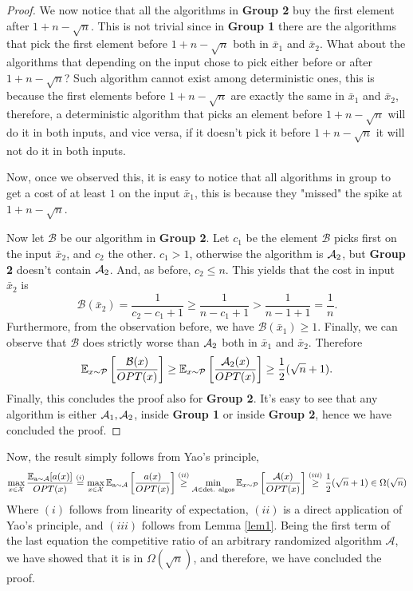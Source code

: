 \documentclass[11pt]{article}
\begin{document}
\begin{enumerate}
\begin{proof}
    We now notice that all the algorithms in \textbf{Group 2} buy the first element after $1 + n - \sqrt{n}$. This is not trivial since in \textbf{Group 1} there are the algorithms that pick the first element before $1 + n - \sqrt{n}$ both in $\bar x_1$ and $\bar x_2$. What about the algorithms that depending on the input chose to pick either before or after $1 + n - \sqrt{n}$? Such algorithm cannot exist among deterministic ones, this is because the first elements before $1 + n - \sqrt{n}$ are exactly the same in $\bar x_1$ and $\bar x_2$, therefore, a deterministic algorithm that picks an element before $1 + n - \sqrt{n}$ will do it in both inputs, and vice versa, if it doesn't pick it before $1 + n - \sqrt{n}$ it will not do it in both inputs.

    Now, once we observed this, it is easy to notice that all algorithms in group to get a cost of at least $1$ on the input $\bar x_1$, this is because they "missed" the spike at $1 + n - \sqrt{n}$. 
    
    Now let $\mathcal {B}$ be our algorithm in \textbf{Group 2}. Let $c_1$ be the element $\mathcal {B}$ picks first on the input $\bar x_2$, and $c_2$ the other. $c_1>1$, otherwise the algorithm is $\mathcal{A}_2$, but \textbf{Group 2} doesn't contain $\mathcal{A}_2$. And, as before, $c_2\leq n$. This yields that the cost in input $\bar x_2$ is 
    \begin{equation*}
        \mathcal {B}(\bar x_2) = \frac{1}{c_2 - c_1 + 1} \geq  \frac{1}{n - c_1 + 1} > \frac{1}{n-1+1} = \frac{1}{n}.
    \end{equation*}
    Furthermore, from the observation before, we have $\mathcal{B}(\bar x_1) \geq 1$. Finally, we can observe that $\mathcal{B}$ does strictly worse than $\mathcal{A}_2$ both in $\bar x_1$ and $\bar x_2$. Therefore
    \begin{equation*}
        \mathbb{E} _{x\sim \mathcal{P}}\left[\frac{\mathcal{B}(x)}{OPT(x)}\right] \geq \mathbb{E} _{x\sim \mathcal{P}}\left[\frac{\mathcal{A}_2(x)}{OPT(x)}\right] \geq \frac{1}{2}(\sqrt{n} + 1).
    \end{equation*}
    Finally, this concludes the proof also for \textbf{Group 2}. It's easy to see that any algorithm is either $\mathcal{A}_1,\mathcal{A}_2$, inside \textbf{Group 1} or inside \textbf{Group 2}, hence we have concluded the proof.
    \end{proof}
    Now, the result simply follows from Yao's principle,
    \begin{equation*}
        \max_{x \in \mathcal{X}} \frac{\mathbb{E}_{\text{a}\sim \mathcal{A}}[a(x)]}{OPT(x)} \stackrel{(i)}{=} \max_{x \in \mathcal{X}} \mathbb{E}_{\text{a}\sim \mathcal{A}} \left[\frac{a(x)}{OPT(x)}\right] \stackrel{(ii)}{\geq} \min_{\mathcal{A} \in \text{det. algos}}\mathbb{E}_{x \sim \mathcal{P}}\left[\frac{\mathcal{A}(x)}{OPT(x)}\right] \stackrel{(iii)}{\geq} \frac{1}{2}(\sqrt{n} + 1) \in \Omega(\sqrt{n})
    \end{equation*}
    Where $(i)$ follows from linearity of expectation, $(ii)$ is a direct application of Yao's principle, and $(iii)$ follows from Lemma \ref{lem1}. 
    Being the first term of the last equation the competitive ratio of an arbitrary randomized algorithm $\mathcal A$, we have showed that it is in $\Omega\left(\sqrt{n}\right)$, and therefore, we have concluded the proof.
\end{enumerate}
\end{document}
